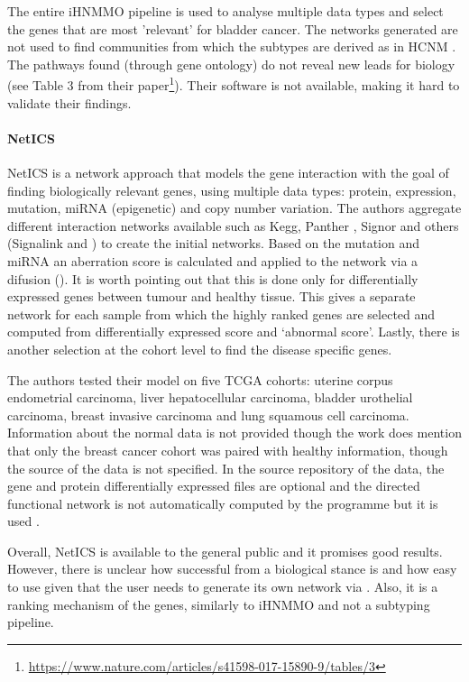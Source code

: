The entire iHNMMO pipeline is used to analyse multiple data types and select the genes that are most 'relevant' for bladder cancer. The networks generated are not used to find communities from which the subtypes are derived as in HCNM \cite{Vangimalla2021-fc, Care2019-ij}. The pathways found (through gene ontology) do not reveal new leads for biology (see Table 3 from their paper\footnote{\url{https://www.nature.com/articles/s41598-017-15890-9/tables/3}}). Their software is not available, making it hard to validate their findings.

\paragraph*{NetICS} \label{s:lit:netICS}

NetICS \citet{Dimitrakopoulos2018-br} is a network approach that models the gene interaction with the goal of finding biologically relevant genes, using multiple data types: protein, expression, mutation, miRNA (epigenetic) and copy number variation. The authors aggregate different interaction networks available such as Kegg\cite{Kanehisa2017-wj}, Panther \cite{Thomas2022-kn}, Signor \cite{Perfetto2016-tw} and others (Signalink\cite{Fazekas2013-qh} and \citet{Wu2010-ap}) to create the initial networks. Based on the mutation and miRNA an aberration score is calculated and applied to the network via a difusion (\cite{Leiserson2015-kv}). It is worth pointing out that this is done only for differentially expressed genes between tumour and healthy tissue. This gives a separate network for each sample from which the highly ranked genes are selected and computed from differentially expressed score and ‘abnormal score’. Lastly, there is another selection at the cohort level to find the disease specific genes.

The authors tested their model on five TCGA cohorts: uterine corpus endometrial carcinoma, liver hepatocellular carcinoma, bladder urothelial carcinoma, breast invasive carcinoma and lung squamous cell carcinoma. Information about the normal data is not provided though the work does mention that only the breast cancer cohort was paired with healthy information, though the source of the data is not specified. In the source repository of the data, the gene and protein differentially expressed files are optional and the directed functional network is not automatically computed by the programme but it is used \citet{Wu2010-ap}.

Overall, NetICS is available to the general public and it promises good results. However, there is unclear how successful from a biological stance is and how easy to use given that the user needs to generate its own network via \citet{Wu2010-ap}. Also, it is a ranking mechanism of the genes, similarly to iHNMMO and not a subtyping pipeline.




